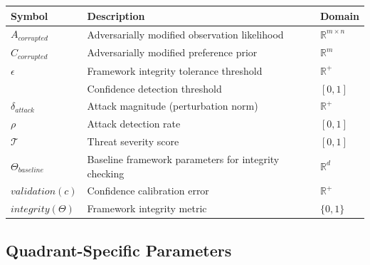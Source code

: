 \documentclass[
]{article}
\newcounter{none} %
\begin{document}
{\def\LTcaptype{none} %
\begin{longtable}[]{@{}
  >{\raggedright\arraybackslash}p{}
  >{\raggedright\arraybackslash}p{}
  >{\raggedright\arraybackslash}p{}@{}}
\toprule\noalign{}
\begin{minipage}[b]{\linewidth}\raggedright
Symbol
\end{minipage} & \begin{minipage}[b]{\linewidth}\raggedright
Description
\end{minipage} & \begin{minipage}[b]{\linewidth}\raggedright
Domain
\end{minipage} \\
\midrule\noalign{}
\endhead
\bottomrule\noalign{}
\endlastfoot
\(A_{corrupted}\) & Adversarially modified observation likelihood &
\(\mathbb{R}^{m \times n}\) \\
\(C_{corrupted}\) & Adversarially modified preference prior &
\(\mathbb{R}^m\) \\
\(\epsilon\) & Framework integrity tolerance threshold &
\(\mathbb{R}^+\) \\
\(\gamma) & Confidence detection threshold & \([0,1]\) \\
\(\delta_{attack}\) & Attack magnitude (perturbation norm) &
\(\mathbb{R}^+\) \\
\(\rho\) & Attack detection rate & \([0,1]\) \\
\(\mathcal{T}\) & Threat severity score & \([0,1]\) \\
\(\Theta_{baseline}\) & Baseline framework parameters for integrity
checking & \(\mathbb{R}^d\) \\
\(validation(c)\) & Confidence calibration error & \(\mathbb{R}^+\) \\
\(integrity(\Theta)\) & Framework integrity metric & \(\{0,1\}\) \\
\end{longtable}
}

\subsection{Quadrant-Specific
Parameters}\label{quadrant-specific-parameters}
\end{document}
